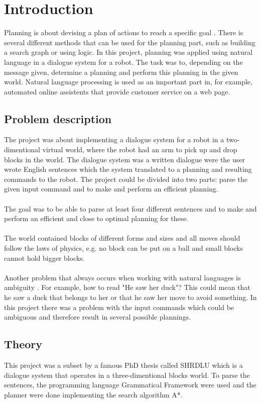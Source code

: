 \chapter{Introduction}
Planning is about devising a plan of actions to reach a specific goal \citep{planning_ai}. There is several different methods that can be used for the planning part, such as building a search graph or using logic. In this project, planning was applied using natural language in a dialogue system for a robot. The task was to, depending on the message given, determine a planning and perform this planning in the given world. Natural language processing is used as an important part in, for example, automated online assistents that provide customer service on a web page. 

\section{Problem description}
The project was about implementing a dialogue system for a robot in a two-dimentional virtual world, where the robot had an arm to pick up and drop blocks in the world. The dialogue system was a written dialogue were the user wrote English sentences which the system translated to a planning and resulting commands to the robot. The project could be divided into two parts: parse the given input command and to make and perform an efficient planning. \\\\
The goal was to be able to parse at least four different sentences and to make and perform an efficient and close to optimal planning for these. 
\\\\
The world contained blocks of different forms and sizes and all moves should follow the laws of physics, e.g. no block can be put on a ball and small blocks cannot hold bigger blocks. \\\\
Another problem that always occurs when working with natural languages is ambiguity \citep{naturallang_ai}. For example, how to read "He saw her duck"? This could mean that he saw a duck that belongs to her or that he saw her move to avoid something. In this project there was a problem with the input commands which could be ambiguous and therefore result in several possible plannings. 

\section{Theory}
This project was a subset by a famous PhD thesis called SHRDLU which  is a dialogue system that operates in a three-dimentional blocks world. To parse the sentences, the programming language Grammatical Framework were used and the planner were done implementing the search algorithm A*.

